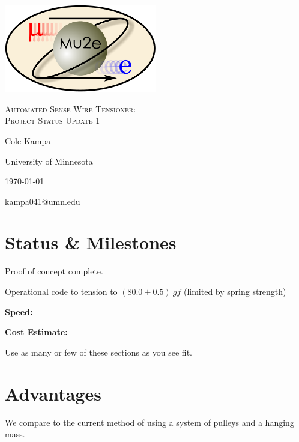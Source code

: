\documentclass[letterpaper,12pt]{article}
\begin{document}
\begin{titlepage}
	\centering
	\includegraphics[width=0.5\textwidth]{mu2e_logo_oval.png}\par\vspace{2cm}
	{\scshape\LARGE Automated Sense Wire Tensioner: \\ Project Status Update 1\par}
	\vspace{3cm}
	{\Large Cole Kampa\par}
	\vspace{3.5cm}
	{\large University of Minnesota\par}
 	\vspace{.5cm}
	{\large \today \par}
	\vfill
	{kampa041@umn.edu\par}
\end{titlepage}

\clearpage
\setcounter{page}{2}


\section*{Status \& Milestones}
\begin{itemize}{
\item{
Proof of concept complete.
}
\item{
Operational code to tension to $(80.0\pm 0.5)\ gf$ (limited by spring strength)
}
\item{
\textbf{Speed:}
}
\item{
\textbf{Cost Estimate:}
}
}
\end{itemize}
Use as many or few of these sections as you see fit.

\section*{Advantages}
We compare to the current method of using a system of pulleys and a hanging mass.
\begin{itemize}{
\item{

}
\item{

}
\item{

}
}
\end{itemize}
\end{document}
